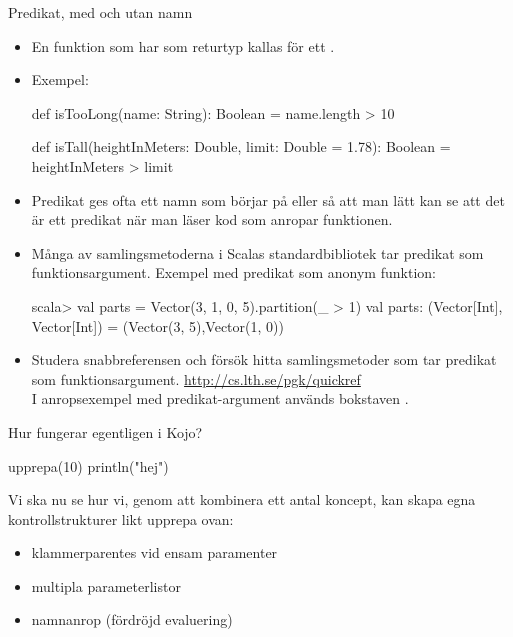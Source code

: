 \begin{Slide}{Predikat, med och utan namn}
\begin{itemize}\SlideFontSmall
\item En funktion som har  som returtyp kallas för ett . 
\item Exempel:
\begin{Code}
def isTooLong(name: String): Boolean = name.length > 10

def isTall(heightInMeters: Double, limit: Double = 1.78): Boolean = 
  heightInMeters > limit
\end{Code}
\item Predikat ges ofta ett namn som börjar på  eller  så att man lätt kan se att det är ett predikat när man läser kod som anropar funktionen.
\item Många av samlingsmetoderna i Scalas standardbibliotek tar predikat som funktionsargument. Exempel med predikat som anonym funktion: 
\begin{REPLnonum}
scala> val parts = Vector(3, 1, 0, 5).partition(_ > 1)
val parts: (Vector[Int], Vector[Int]) = 
  (Vector(3, 5),Vector(1, 0))
\end{REPLnonum} 
\item Studera snabbreferensen och försök hitta samlingsmetoder som tar predikat som funktionsargument. \url{http://cs.lth.se/pgk/quickref} \\I anropsexempel med predikat-argument används bokstaven .
\end{itemize}  
\end{Slide}



\begin{Slide}{Hur fungerar egentligen  i Kojo?}
\begin{Code}[basicstyle=\ttfamily\SlideFontSize{14}{16}]
upprepa(10) {
  println("hej")
}
\end{Code}

\pause
Vi ska nu se hur vi, genom att kombinera ett antal koncept, kan skapa egna kontrollstrukturer likt upprepa ovan:
\begin{itemize}
\item klammerparentes vid ensam paramenter
\item multipla parameterlistor
\item namnanrop (fördröjd evaluering)
\end{itemize}
\end{Slide}



